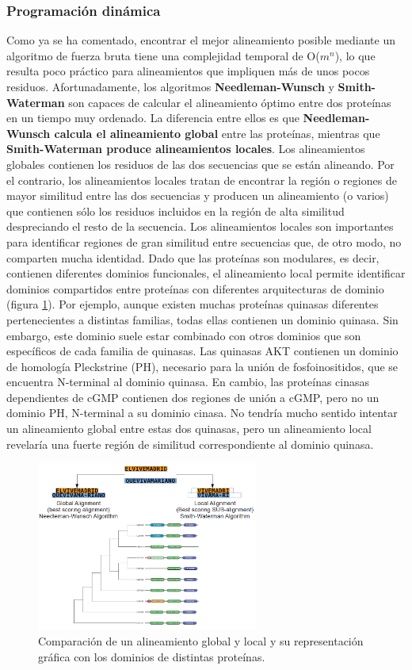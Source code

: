 \subsubsection{Programación dinámica}
Como ya se ha comentado, encontrar el mejor alineamiento posible mediante un algoritmo de fuerza bruta tiene una complejidad temporal de O($m^n$), lo que resulta poco práctico para alineamientos que impliquen más de unos pocos residuos. Afortunadamente, los algoritmos \textbf{Needleman-Wunsch} y \textbf{Smith- Waterman} son capaces de calcular el alineamiento óptimo entre dos proteínas en un tiempo muy ordenado. La diferencia entre ellos es que \textbf{Needleman-Wunsch calcula el alineamiento global} entre las proteínas, mientras que \textbf{Smith-Waterman produce alineamientos locales}. Los alineamientos globales contienen los residuos de las dos secuencias que se están alineando. Por el contrario, los alineamientos locales tratan de encontrar la región o regiones de mayor similitud entre las dos secuencias y producen un alineamiento (o varios) que contienen sólo los residuos incluidos en la región de alta similitud despreciando el resto de la secuencia. Los alineamientos locales son importantes para identificar regiones de gran similitud entre secuencias que, de otro modo, no comparten mucha identidad. Dado que las proteínas son modulares, es decir, contienen diferentes dominios funcionales, el alineamiento local permite identificar dominios compartidos entre proteínas con diferentes arquitecturas de dominio (figura \ref{fig:global-local}). Por ejemplo, aunque existen muchas proteínas quinasas diferentes pertenecientes a distintas familias, todas ellas contienen un dominio quinasa. Sin embargo, este dominio suele estar combinado con otros dominios que son específicos de cada familia de quinasas. Las quinasas AKT contienen un dominio de homología Pleckstrine (PH), necesario para la unión de fosfoinositidos, que se encuentra N-terminal al dominio quinasa. En cambio, las proteínas cinasas dependientes de cGMP contienen dos regiones de unión a cGMP, pero no un dominio PH, N-terminal a su dominio cinasa. No tendría mucho sentido intentar un alineamiento global entre estas dos quinasas, pero un alineamiento local revelaría una fuerte región de similitud correspondiente al dominio quinasa. 

\begin{figure}[htbp]
\centering
\includegraphics[width = 0.65\textwidth]{figs/alineamientos-global-local.png}
\caption{Comparación de un alineamiento global y local y su representación gráfica con los dominios de distintas proteínas.}
\label{fig:global-local}
\end{figure}

